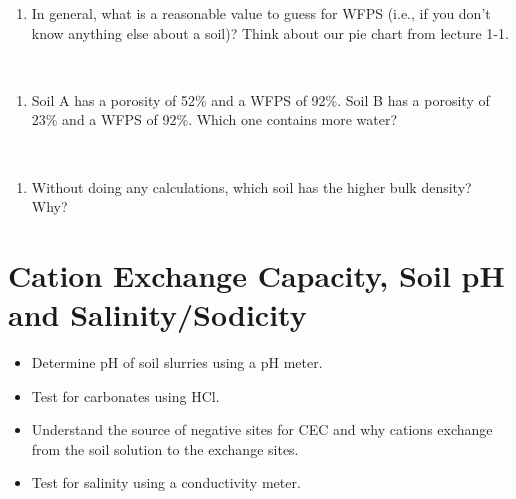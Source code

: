 \documentclass[
  letterpaper,
  twocolumn,
  portrait]{scrbook}
\providecommand{\tightlist}{%
  \setlength{\itemsep}{0pt}\setlength{\parskip}{0pt}}\usepackage{longtable,booktabs,array}
\begin{document}
\begin{enumerate}
\def\labelenumi{\arabic{enumi}.}
\setcounter{enumi}{4}
\tightlist
\item
  In general, what is a reasonable value to guess for WFPS (i.e., if you
  don't know anything else about a soil)? Think about our pie chart from
  lecture 1-1.
\end{enumerate}

~ ~

\begin{enumerate}
\def\labelenumi{\arabic{enumi}.}
\setcounter{enumi}{5}
\tightlist
\item
  Soil A has a porosity of 52\% and a WFPS of 92\%. Soil B has a
  porosity of 23\% and a WFPS of 92\%. Which one contains more water?
\end{enumerate}

~ ~

\begin{enumerate}
\def\labelenumi{\arabic{enumi}.}
\setcounter{enumi}{6}
\tightlist
\item
  Without doing any calculations, which soil has the higher bulk
  density? Why?
\end{enumerate}


\hypertarget{cation-exchange-capacity-soil-ph-and-salinitysodicity}{%
\chapter{\texorpdfstring{\textbf{Cation Exchange Capacity, Soil pH and
Salinity/Sodicity}}{Cation Exchange Capacity, Soil pH and Salinity/Sodicity}}\label{cation-exchange-capacity-soil-ph-and-salinitysodicity}}

\begin{tcolorbox}[enhanced jigsaw, colframe=quarto-callout-note-color-frame, coltitle=black, arc=.35mm, breakable, bottomrule=.15mm, colback=white, rightrule=.15mm, toprule=.15mm, opacityback=0, bottomtitle=1mm, left=2mm, titlerule=0mm, leftrule=.75mm, opacitybacktitle=0.6, toptitle=1mm, title=\textcolor{quarto-callout-note-color}{\faInfo}\hspace{0.5em}{Objectives}, colbacktitle=quarto-callout-note-color!10!white]

\begin{itemize}
\tightlist
\item
  Determine pH of soil slurries using a pH meter.
\item
  Test for carbonates using HCl.
\item
  Understand the source of negative sites for CEC and why cations
  exchange from the soil solution to the exchange sites.
\item
  Test for salinity using a conductivity meter.
\end{itemize}

\end{tcolorbox}
\end{document}
